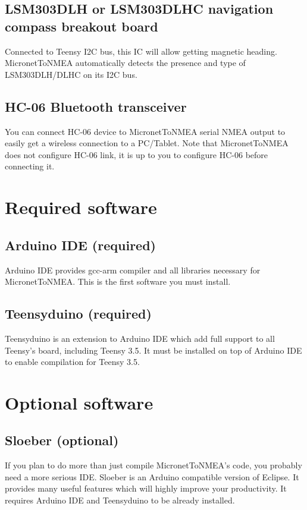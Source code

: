 \documentclass{report}
\begin{document}
\subsection{LSM303DLH or LSM303DLHC navigation compass breakout board}

Connected to Teensy I2C bus, this IC will allow getting magnetic heading. MicronetToNMEA automatically detects the presence and type of LSM303DLH/DLHC on its I2C bus.

\subsection{HC-06 Bluetooth transceiver}

You can connect HC-06 device to MicronetToNMEA serial NMEA output to easily get a wireless connection to a PC/Tablet. Note that MicronetToNMEA does not configure HC-06 link, it is up to you to configure HC-06 before connecting it.

\section{Required software}

\subsection{Arduino IDE (required)}
Arduino IDE provides gcc-arm compiler and all libraries necessary for MicronetToNMEA. This is the first software you must install.

\subsection{Teensyduino (required)}

Teensyduino is an extension to Arduino IDE which add full support to all Teensy’s board, including Teensy 3.5. It must be installed on top of Arduino IDE to enable compilation for Teensy 3.5.

\section{Optional software}

\subsection{Sloeber (optional)}

If you plan to do more than just compile MicronetToNMEA’s code, you probably need a more serious IDE. Sloeber is an Arduino compatible version of Eclipse. It provides many useful features which will highly improve your productivity. It requires Arduino IDE and Teensyduino to be already installed.
\end{document}
